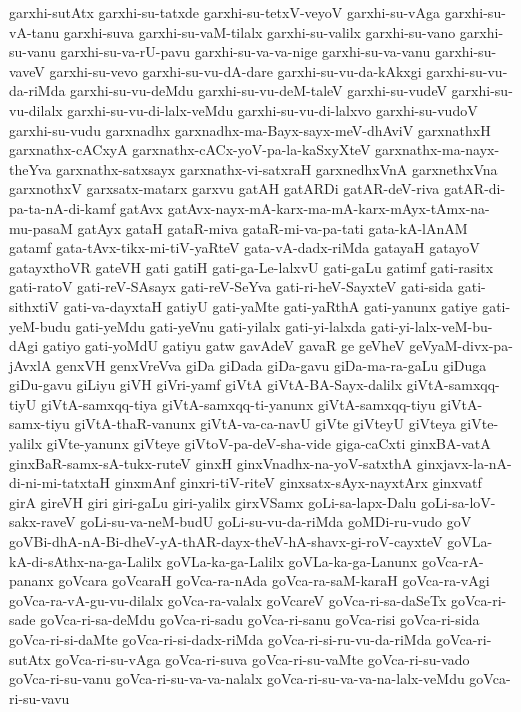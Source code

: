 {garxhi-sutAtx
garxhi-su-tatxde
garxhi-su-tetxV-veyoV
garxhi-su-vAga
garxhi-su-vA-tanu
garxhi-suva
garxhi-su-vaM-tilalx
garxhi-su-valilx
garxhi-su-vano
garxhi-su-vanu
garxhi-su-va-rU-pavu
garxhi-su-va-va-nige
garxhi-su-va-vanu
garxhi-su-vaveV
garxhi-su-vevo
garxhi-su-vu-dA-dare
garxhi-su-vu-da-kAkxgi
garxhi-su-vu-da-riMda
garxhi-su-vu-deMdu
garxhi-su-vu-deM-taleV
garxhi-su-vudeV
garxhi-su-vu-dilalx
garxhi-su-vu-di-lalx-veMdu
garxhi-su-vu-di-lalxvo
garxhi-su-vudoV
garxhi-su-vudu
garxnadhx
garxnadhx-ma-Bayx-sayx-meV-dhAviV
garxnathxH
garxnathx-cACxyA
garxnathx-cACx-yoV-pa-la-kaSxyXteV
garxnathx-ma-nayx-theYva
garxnathx-satxsayx
garxnathx-vi-satxraH
garxnedhxVnA
garxnethxVna
garxnothxV
garxsatx-matarx
garxvu
gatAH
gatARDi
gatAR-deV-riva
gatAR-di-pa-ta-nA-di-kamf
gatAvx
gatAvx-nayx-mA-karx-ma-mA-karx-mAyx-tAmx-na-mu-pasaM
gatAyx
gataH
gataR-miva
gataR-mi-va-pa-tati
gata-kA-lAnAM
gatamf
gata-tAvx-tikx-mi-tiV-yaRteV
gata-vA-dadx-riMda
gatayaH
gatayoV
gatayxthoVR
gateVH
gati
gatiH
gati-ga-Le-lalxvU
gati-gaLu
gatimf
gati-rasitx
gati-ratoV
gati-reV-SAsayx
gati-reV-SeYva
gati-ri-heV-SayxteV
gati-sida
gati-sithxtiV
gati-va-dayxtaH
gatiyU
gati-yaMte
gati-yaRthA
gati-yanunx
gatiye
gati-yeM-budu
gati-yeMdu
gati-yeVnu
gati-yilalx
gati-yi-lalxda
gati-yi-lalx-veM-bu-dAgi
gatiyo
gati-yoMdU
gatiyu
gatw
gavAdeV
gavaR
ge
geVheV
geVyaM-divx-pa-jAvxlA
genxVH
genxVreVva
giDa
giDada
giDa-gavu
giDa-ma-ra-gaLu
giDuga
giDu-gavu
giLiyu
giVH
giVri-yamf
giVtA
giVtA-BA-Sayx-dalilx
giVtA-samxqq-tiyU
giVtA-samxqq-tiya
giVtA-samxqq-ti-yanunx
giVtA-samxqq-tiyu
giVtA-samx-tiyu
giVtA-thaR-vanunx
giVtA-va-ca-navU
giVte
giVteyU
giVteya
giVte-yalilx
giVte-yanunx
giVteye
giVtoV-pa-deV-sha-vide
giga-caCxti
ginxBA-vatA
ginxBaR-samx-sA-tukx-ruteV
ginxH
ginxVnadhx-na-yoV-satxthA
ginxjavx-la-nA-di-ni-mi-tatxtaH
ginxmAnf
ginxri-tiV-riteV
ginxsatx-sAyx-nayxtArx
ginxvatf
girA
gireVH
giri
giri-gaLu
giri-yalilx
girxVSamx
goLi-sa-lapx-Dalu
goLi-sa-loV-sakx-raveV
goLi-su-va-neM-budU
goLi-su-vu-da-riMda
goMDi-ru-vudo
goV
goVBi-dhA-nA-Bi-dheV-yA-thAR-dayx-theV-hA-shavx-gi-roV-cayxteV
goVLa-kA-di-sAthx-na-ga-Lalilx
goVLa-ka-ga-Lalilx
goVLa-ka-ga-Lanunx
goVca-rA-pananx
goVcara
goVcaraH
goVca-ra-nAda
goVca-ra-saM-karaH
goVca-ra-vAgi
goVca-ra-vA-gu-vu-dilalx
goVca-ra-valalx
goVcareV
goVca-ri-sa-daSeTx
goVca-ri-sade
goVca-ri-sa-deMdu
goVca-ri-sadu
goVca-ri-sanu
goVca-risi
goVca-ri-sida
goVca-ri-si-daMte
goVca-ri-si-dadx-riMda
goVca-ri-si-ru-vu-da-riMda
goVca-ri-sutAtx
goVca-ri-su-vAga
goVca-ri-suva
goVca-ri-su-vaMte
goVca-ri-su-vado
goVca-ri-su-vanu
goVca-ri-su-va-va-nalalx
goVca-ri-su-va-va-na-lalx-veMdu
goVca-ri-su-vavu
}
